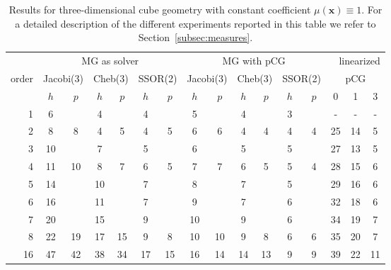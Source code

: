 \documentclass[smallcondensed,final]{svjour3}     %
\newcommand{\bs}[1]{\ensuremath{\boldsymbol #1}}
\begin{document}
\begin{table}
  \caption{\label{tab:3d-box} Results for three-dimensional cube
    geometry with constant coefficient $\mu(\bs x) \equiv 1$. For a
    detailed description of the different experiments reported in this
    table we refer to Section~\ref{subsec:measures}.}  \centering
	  \begin{tabular}{|r|c c|c c|c c||c c|c c|c c||c c c|} 
	    \hline
	    & \multicolumn{6}{c||}{MG as solver} & \multicolumn{6}{c||}{MG with pCG} & \multicolumn{3}{r|}{linearized} \\
	    \cline{2-13}
	    \!\!\! order \!\!\!\! &  \multicolumn{2}{c|}{\!\scriptsize  Jacobi(3)\!} &  \multicolumn{2}{c|}{\!\scriptsize Cheb(3)\!} & \multicolumn{2}{c||}{\!\scriptsize  SSOR(2)\!} & \multicolumn{2}{c|}{\!\scriptsize Jacobi(3)\!} &  \multicolumn{2}{c|}{\!\scriptsize Cheb(3)\!} & \multicolumn{2}{c||}{\!\scriptsize SSOR(2)\!} & \multicolumn{3}{c|}{pCG}\\
	\hline
	 & $h$ & $p$ & $h$ & $p$& $h$ & $p$& $h$ & $p$& $h$ & $p$& $h$ & $p$& 0 & 1 & 3\\
	 \cline{2-16}
1 & 6 & & 4 & & 4 & & 5 & & 4 & & 3 & & - & - & - \\
2 & 8 & 8 & 4 & 5 & 4 & 5 & 6 & 6 & 4 & 4 & 4 & 4 &  25 & 14 & 5 \\
3 & 10 & & 7 & & 5 & & 6 & & 5 & & 5 & & 27 & 13 & 5  \\
4 & 11 & 10 & 8 & 7 & 6 & 5 & 7 & 7 & 6 & 5 & 5 & 4 & 28 & 15 & 6 \\
5 & 14 & & 10 & & 7 & & 8 & & 7 & & 5 & & 29 & 16 & 6 \\
6 & 16 & & 11 & & 7 & & 9 & & 7 & & 6 & & 32 & 18 & 6 \\
7 & 20 & & 15 & & 9 & & 10 & & 9 & & 6 & & 34 & 19 & 7 \\
8 & 22 & 19 & 17 & 15 & 9 & 8 & 10 & 10 & 9 & 8 & 6 & 6 & 35 & 20 & 7 \\
16 & 47 & 42 & 38 & 34 & 17 & 15 & 16 & 14 & 14 & 13 & 9 & 9 & 39 & 22 & 11 \\
\hline 
 \end{tabular}
\end{table}
\end{document}
